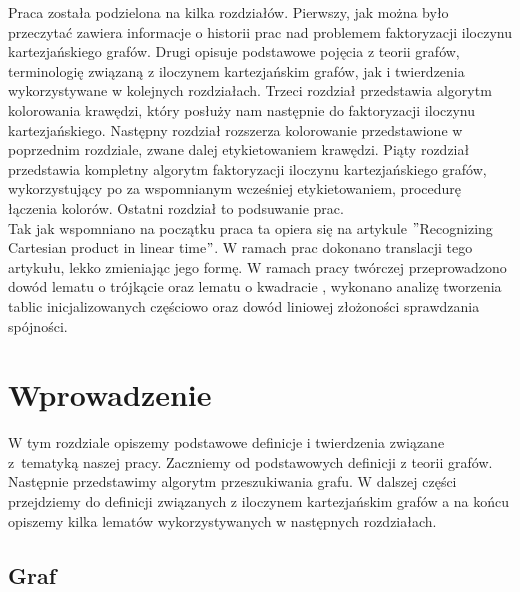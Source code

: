 \documentclass[12pt,a4paper,titlepage]{article}
\begin{document}
Praca została podzielona na kilka rozdziałów. Pierwszy, jak można było przeczytać zawiera informacje o historii prac nad problemem faktoryzacji iloczynu kartezjańskiego grafów. Drugi opisuje podstawowe pojęcia z teorii grafów, terminologię związaną z iloczynem kartezjańskim grafów, jak i twierdzenia wykorzystywane w kolejnych rozdziałach. Trzeci rozdział przedstawia algorytm kolorowania krawędzi, który posłuży nam następnie do faktoryzacji iloczynu kartezjańskiego. Następny rozdział rozszerza kolorowanie przedstawione w poprzednim rozdziale, zwane dalej etykietowaniem krawędzi. Piąty rozdział przedstawia kompletny algorytm faktoryzacji iloczynu kartezjańskiego grafów, wykorzystujący po za wspomnianym wcześniej etykietowaniem, procedurę łączenia kolorów. Ostatni rozdział to podsuwanie prac. \\

Tak jak wspomniano na początku praca ta opiera się na artykule $"$Recognizing Cartesian product in linear time$"$. W ramach prac dokonano translacji tego artykułu, lekko zmieniając jego formę. W ramach pracy twórczej przeprowadzono dowód lematu o trójkącie oraz lematu o kwadracie , wykonano analizę tworzenia tablic inicjalizowanych częściowo oraz dowód liniowej złożoności sprawdzania spójności. 
\newpage

\section{Wprowadzenie}
W tym rozdziale opiszemy podstawowe definicje i twierdzenia związane z~tematyką naszej pracy. Zaczniemy od podstawowych definicji z teorii grafów. Następnie przedstawimy algorytm przeszukiwania grafu. W dalszej części przejdziemy do definicji związanych z iloczynem kartezjańskim grafów a na końcu opiszemy kilka lematów wykorzystywanych w następnych rozdziałach.
\subsection{Graf}
\end{document}
